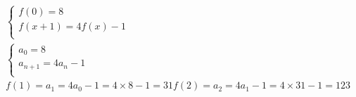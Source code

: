 \documentclass{article}
\begin{document}
\begin{equation*}
\begin{aligned}
  \begin{cases}
    f(0) = 8 \\
    f(x + 1) = 4f(x) - 1 \\
  \end{cases}
  \\
  \begin{cases}
    a_0 = 8 \\
    a_{n + 1} = 4a_n - 1 \\
  \end{cases}
  \\
  f(1) = a_1 = 4a_0 - 1 = 4 \times 8 - 1 = 31
  f(2) = a_2 = 4a_1 - 1 = 4 \times 31 - 1 = 123
\end{aligned}
\end{equation*}
\end{document}
